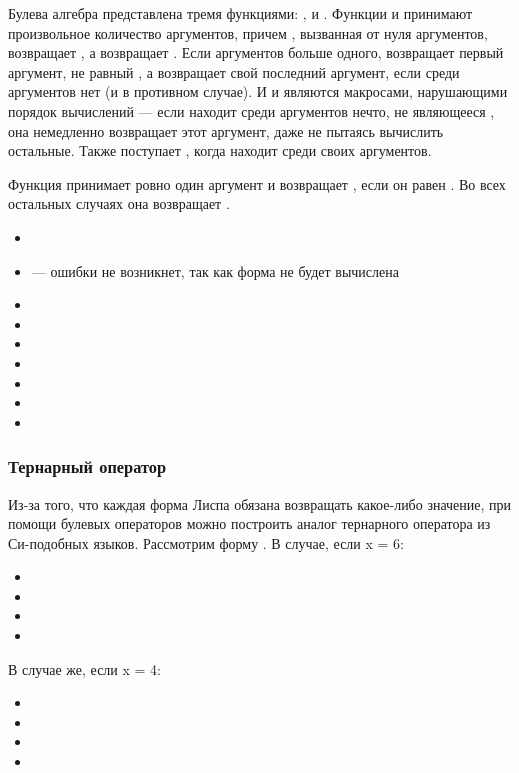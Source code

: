 \documentclass[a4paper, 12pt, titlepage, twoside]{article}
\newenvironment{examples}
               {\begin{itemize}\renewcommand{\labelitemi}{ }}
               {\end{itemize}}
\begin{document}
Булева алгебра представлена тремя функциями: ,  и . Функции  и  принимают произвольное количество аргументов, причем , вызванная от нуля аргументов, возвращает , а  возвращает . Если аргументов больше одного,  возвращает первый аргумент, не равный , а  возвращает свой последний аргумент, если среди аргументов нет  (и  в противном случае). И  и  являются макросами, нарушающими порядок вычислений --- если  находит среди аргументов нечто, не являющееся , она немедленно возвращает этот аргумент, даже не пытаясь вычислить остальные. Также поступает , когда находит  среди своих аргументов.

Функция  принимает ровно один аргумент и возвращает , если он равен . Во всех остальных случаях она возвращает .
\begin{examples}
\item {}
\item {} --- ошибки не возникнет, так как форма  не будет вычислена
\item {}
\item {}
\item {}
\item {}
\item {}
\item {}
\item {}
\end{examples}
\subsubsection{Тернарный оператор}
Из-за того, что каждая форма Лиспа обязана возвращать какое-либо значение, при помощи булевых операторов можно построить аналог тернарного оператора из Си-подобных языков.
Рассмотрим форму . В случае, если x = 6:
\begin{examples}
\item {}
\item {}
\item {}
\item {}
\end{examples}
В случае же, если x = 4:
\begin{examples}
\item {}
\item {}
\item {}
\item {}
\end{examples}
\end{document}
